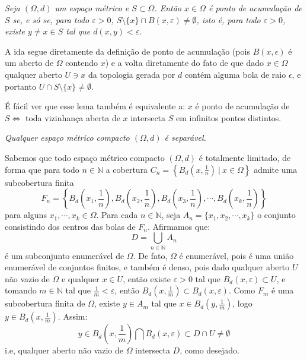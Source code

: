 \begin{lema}
\textit{Seja $(\Omega, d)$ um espaço métrico e $S \subset \Omega$. Então $x \in \Omega$ é ponto de acumulação de $S$ se, e só se, para todo $\varepsilon > 0$, $S \setminus \{x\} \cap B(x, \varepsilon) \neq \emptyset$, isto é, para todo $\varepsilon > 0$, existe $y \neq x \in S$ tal que $d(x, y) < \varepsilon$.}\par
\end{lema}
\begin{demm}
A ida segue diretamente da definição de ponto de acumulação (pois $B(x, \epsilon)$ é um aberto de $\Omega$ contendo $x$) e a volta diretamente do fato de que dado $x \in \Omega$ qualquer aberto $U \ni x$ da topologia gerada por $d$ contém alguma bola de raio $\epsilon$, e portanto $U \cap S \setminus \{ x \} \neq \emptyset$. 
\par
\begin{oobs}
É fácil ver que esse lema também é equivalente a: $x$ é ponto de acumulação de $S \iff$ toda vizinhança aberta de $x$ intersecta $S$ em infinitos pontos distintos.
\end{oobs}
\end{demm}
\begin{lema}\label{LemaCinco}
\textit{Qualquer espaço métrico compacto $(\Omega, d)$ é separável.}
\end{lema}
\begin{demm}
Sabemos que todo espaço métrico compacto $(\Omega, d)$ é totalmente limitado, de forma que para todo $n \in \mathbb{N}$ a cobertura $C_n = \left\{B_d\left(x, \frac{1}{n} \right) \ \vert \ x \in \Omega \right\}$ admite uma subcobertura finita $$F_n = \left\{B_d\left(x_1, \frac{1}{n} \right), B_d\left(x_2,\frac{1}{n} \right), B_d\left(x_3, \frac{1}{n} \right), \cdots, B_d\left(x_k, \frac{1}{n} \right) \right\}$$
para alguns $x_1, \cdots, x_k \in \Omega$. Para cada $n \in \mathbb{N}$, seja $A_n = \{x_1, x_2, \cdots, x_k \}$ o conjunto consistindo dos centros das bolas de $F_n$.  Afirmamos que: $$D = \displaystyle{\bigcup_{n \in \mathbb{N}} A_n}$$
é um subconjunto enumerável de $\Omega$. De fato, $\Omega$ é enumerável, pois é uma união enumerável de conjuntos finitos, e também é denso, pois dado qualquer aberto $U$ não vazio de $\Omega$ e qualquer $x \in U$, então existe $\varepsilon > 0$ tal que $B_d(x, \varepsilon) \subset U$, e tomando $m \in \mathbb{N}$ tal que $\frac{1}{m} < \varepsilon$, então $B_d\left(x, \frac{1}{m} \right) \subset B_d(x, \varepsilon)$. Como $F_m$ é uma subcobertura finita de $\Omega$, existe $y \in A_m$ tal que $x \in B_d\left(y, \frac{1}{m}\right )$, logo $y \in  B_d\left(x, \frac{1}{m}\right )$. Assim:
$$y \in B_d\left(x, \frac{1}{m} \right) \bigcap B_d(x, \varepsilon) \subset D \cap U \neq \emptyset$$
i.e, qualquer aberto não vazio de $\Omega$ intersecta $D$, como desejado.
\end{demm}
